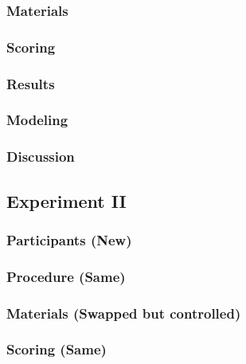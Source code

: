 \documentclass[]{book}
\begin{document}
\hypertarget{materials-1}{%
\subsubsection{Materials}\label{materials-1}}

\hypertarget{scoring}{%
\subsubsection{Scoring}\label{scoring}}

\hypertarget{results-1}{%
\subsubsection{Results}\label{results-1}}

\hypertarget{modeling-1}{%
\subsubsection{Modeling}\label{modeling-1}}

\hypertarget{discussion-1}{%
\subsubsection{Discussion}\label{discussion-1}}

\hypertarget{experiment-ii}{%
\subsection{Experiment II}\label{experiment-ii}}

\hypertarget{participants-new}{%
\subsubsection{Participants (New)}\label{participants-new}}

\hypertarget{procedure-same}{%
\subsubsection{Procedure (Same)}\label{procedure-same}}

\hypertarget{materials-swapped-but-controlled}{%
\subsubsection{Materials (Swapped but controlled)}\label{materials-swapped-but-controlled}}

\hypertarget{scoring-same}{%
\subsubsection{Scoring (Same)}\label{scoring-same}}
\end{document}
